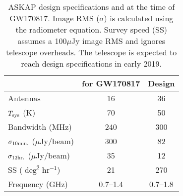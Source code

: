 \begin{table}
	\centering
	\caption[ASKAP design specifications and at the time of GW170817.]{ASKAP design specifications and at the time of GW170817. Image RMS ($\sigma$) is calculated using the radiometer equation. Survey speed (SS) assumes a 100$\mu$Jy image RMS and ignores telescope overheads. The telescope is expected to reach design specifications in early 2019.}
	\label{tab:askap_specs}
	\begin{tabular}{lcc}
		\hline\hline
		 & for GW170817 & Design\\
		\hline
        Antennas & 16 & 36\\
		$T_{\rm sys}$ (K) & 70 & 50\\
		Bandwidth (MHz) & 240 & 300\\
        $\sigma_{\rm 10 min.}$ ($\mu$Jy/beam) & 300 & 82\\
        $\sigma_{\rm 12 hr.}$ ($\mu$Jy/beam) & 35 & 12\\
        SS ($\deg^2$hr$^{-1}$) & 21 & 270\\
        Frequency (GHz) & 0.7--1.4 & 0.7--1.8 \\
		\hline\hline
	\end{tabular}
\end{table}
